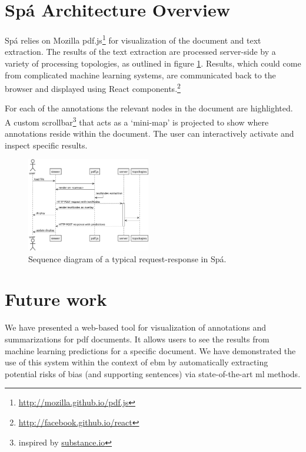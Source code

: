 \documentclass[runningheads,a4paper]{llncs}
\begin{document}

\section{Spá Architecture Overview}
Spá relies on Mozilla pdf.js\footnote{\url{http://mozilla.github.io/pdf.js}} for visualization of the document and text extraction.
The results of the text extraction are processed server-side by a variety of processing topologies, as outlined in figure \ref{fig:sequence}.
Results, which could come from complicated machine learning systems, are communicated back to the browser and displayed using React components.\footnote{\url{http://facebook.github.io/react}}

For each of the annotations the relevant nodes in the document are highlighted.
A custom scrollbar\footnote{inspired by \href{http://substance.io/}{substance.io}} that acts as a `mini-map' is projected to show where annotations reside within the document.
The user can interactively activate and inspect specific results.
\label{section:architecture}
\begin{figure}
  \begin{center}
    \includegraphics[width=0.48\textwidth]{./diagrams/sequence.pdf}
  \end{center}
  \caption{\label{fig:sequence}Sequence diagram of a typical request-response in Spá.}
\end{figure}

\section{Future work}
We have presented a web-based tool for visualization of annotations and summarizations for \ac{pdf} documents.
It allows users to see the results from machine learning predictions for a specific document.
We have demonstrated the use of this system within the context of \ac{ebm} by automatically extracting potential risks of bias (and supporting sentences) via state-of-the-art \ac{ml} methods.
\end{document}
